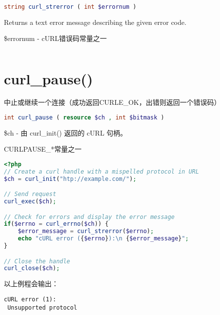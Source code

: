 \begin{lstlisting}[language=PHP]
string curl_strerror ( int $errornum )
\end{lstlisting}

Returns a text error message describing the given error code.

\begin{compactitem}
\item \$errornum - cURL错误码常量之一
\end{compactitem}



\begin{lstlisting}[language=PHP]

\end{lstlisting}

\section{curl\_pause()}

中止或继续一个连接（成功返回CURLE\_OK，出错则返回一个错误码）


\begin{lstlisting}[language=PHP]
int curl_pause ( resource $ch , int $bitmask )
\end{lstlisting}

\begin{compactitem}
\item \$ch - 由 curl\_init() 返回的 cURL 句柄。
\item CURLPAUSE\_*常量之一
\end{compactitem}



\begin{lstlisting}[language=PHP]
<?php
// Create a curl handle with a mispelled protocol in URL
$ch = curl_init("htp://example.com/");

// Send request
curl_exec($ch);

// Check for errors and display the error message
if($errno = curl_errno($ch)) {
    $error_message = curl_strerror($errno);
    echo "cURL error ({$errno}):\n {$error_message}";
}

// Close the handle
curl_close($ch);
\end{lstlisting}

以上例程会输出：

\begin{lstlisting}
cURL error (1):
 Unsupported protocol
\end{lstlisting}

